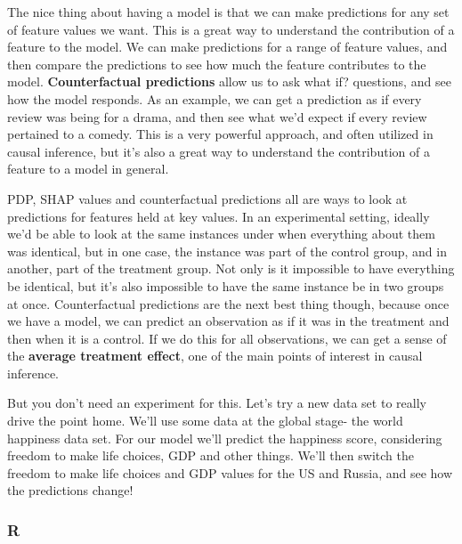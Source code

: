 \documentclass[
  letterpaper,
]{krantz}
\begin{document}
The nice thing about having a model is that we can make predictions for
any set of feature values we want. This is a great way to understand the
contribution of a feature to the model. We can make predictions for a
range of feature values, and then compare the predictions to see how
much the feature contributes to the model. \textbf{Counterfactual
predictions} allow us to ask what if? questions, and see how the model
responds. As an example, we can get a prediction as if every review was
being for a drama, and then see what we'd expect if every review
pertained to a comedy. This is a very powerful approach, and often
utilized in causal inference, but it's also a great way to understand
the contribution of a feature to a model in general.

PDP, SHAP values and counterfactual predictions all are ways to look at
predictions for features held at key values. In an experimental setting,
ideally we'd be able to look at the same instances under when everything
about them was identical, but in one case, the instance was part of the
control group, and in another, part of the treatment group. Not only is
it impossible to have everything be identical, but it's also impossible
to have the same instance be in two groups at once. Counterfactual
predictions are the next best thing though, because once we have a
model, we can predict an observation as if it was in the treatment and
then when it is a control. If we do this for all observations, we can
get a sense of the \textbf{average treatment effect}, one of the main
points of interest in causal inference.

But you don't need an experiment for this. Let's try a new data set to
really drive the point home. We'll use some data at the global stage-
the world happiness data set. For our model we'll predict the happiness
score, considering freedom to make life choices, GDP and other things.
We'll then switch the freedom to make life choices and GDP values for
the US and Russia, and see how the predictions change!

\subsubsection{R}
\end{document}

